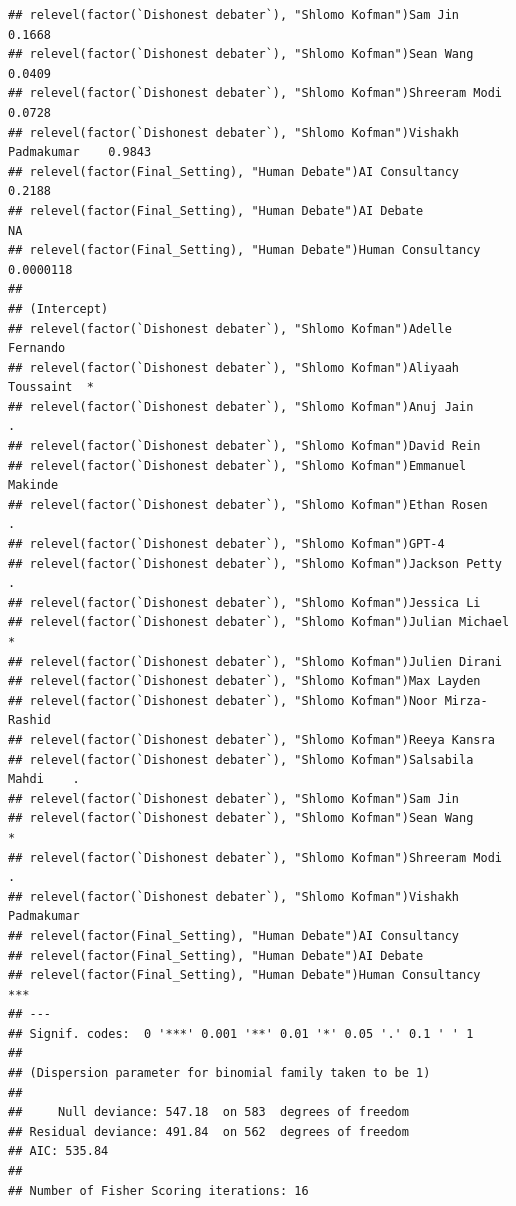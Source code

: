 \documentclass[
]{article}
\begin{document}
\begin{verbatim}
## relevel(factor(`Dishonest debater`), "Shlomo Kofman")Sam Jin               0.1668
## relevel(factor(`Dishonest debater`), "Shlomo Kofman")Sean Wang             0.0409
## relevel(factor(`Dishonest debater`), "Shlomo Kofman")Shreeram Modi         0.0728
## relevel(factor(`Dishonest debater`), "Shlomo Kofman")Vishakh Padmakumar    0.9843
## relevel(factor(Final_Setting), "Human Debate")AI Consultancy               0.2188
## relevel(factor(Final_Setting), "Human Debate")AI Debate                        NA
## relevel(factor(Final_Setting), "Human Debate")Human Consultancy         0.0000118
##                                                                            
## (Intercept)                                                                
## relevel(factor(`Dishonest debater`), "Shlomo Kofman")Adelle Fernando       
## relevel(factor(`Dishonest debater`), "Shlomo Kofman")Aliyaah Toussaint  *  
## relevel(factor(`Dishonest debater`), "Shlomo Kofman")Anuj Jain          .  
## relevel(factor(`Dishonest debater`), "Shlomo Kofman")David Rein            
## relevel(factor(`Dishonest debater`), "Shlomo Kofman")Emmanuel Makinde      
## relevel(factor(`Dishonest debater`), "Shlomo Kofman")Ethan Rosen        .  
## relevel(factor(`Dishonest debater`), "Shlomo Kofman")GPT-4                 
## relevel(factor(`Dishonest debater`), "Shlomo Kofman")Jackson Petty      .  
## relevel(factor(`Dishonest debater`), "Shlomo Kofman")Jessica Li            
## relevel(factor(`Dishonest debater`), "Shlomo Kofman")Julian Michael     *  
## relevel(factor(`Dishonest debater`), "Shlomo Kofman")Julien Dirani         
## relevel(factor(`Dishonest debater`), "Shlomo Kofman")Max Layden            
## relevel(factor(`Dishonest debater`), "Shlomo Kofman")Noor Mirza-Rashid     
## relevel(factor(`Dishonest debater`), "Shlomo Kofman")Reeya Kansra          
## relevel(factor(`Dishonest debater`), "Shlomo Kofman")Salsabila Mahdi    .  
## relevel(factor(`Dishonest debater`), "Shlomo Kofman")Sam Jin               
## relevel(factor(`Dishonest debater`), "Shlomo Kofman")Sean Wang          *  
## relevel(factor(`Dishonest debater`), "Shlomo Kofman")Shreeram Modi      .  
## relevel(factor(`Dishonest debater`), "Shlomo Kofman")Vishakh Padmakumar    
## relevel(factor(Final_Setting), "Human Debate")AI Consultancy               
## relevel(factor(Final_Setting), "Human Debate")AI Debate                    
## relevel(factor(Final_Setting), "Human Debate")Human Consultancy         ***
## ---
## Signif. codes:  0 '***' 0.001 '**' 0.01 '*' 0.05 '.' 0.1 ' ' 1
## 
## (Dispersion parameter for binomial family taken to be 1)
## 
##     Null deviance: 547.18  on 583  degrees of freedom
## Residual deviance: 491.84  on 562  degrees of freedom
## AIC: 535.84
## 
## Number of Fisher Scoring iterations: 16
\end{verbatim}
\end{document}
